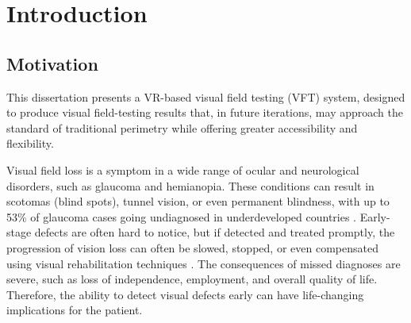 \documentclass{l4proj}
\begin{document}
%
%
%
%
\chapter{Introduction}


\section{Motivation}
 

This dissertation presents a VR-based visual field testing (VFT) system, designed to produce visual field-testing results that, in future iterations, may approach the standard of traditional perimetry while offering greater accessibility and flexibility. 

Visual field loss is a symptom in a wide range of ocular and neurological disorders, such as glaucoma and hemianopia. These conditions can result in scotomas (blind spots), tunnel vision, or even permanent blindness, with up to 53\% of glaucoma cases going undiagnosed in underdeveloped countries \citep{mot1}. Early-stage defects are often hard to notice, but if detected and treated promptly, the progression of vision loss can often be slowed, stopped, or even compensated using visual rehabilitation techniques \citep{mot2}. The consequences of missed diagnoses are severe, such as loss of independence, employment, and overall quality of life. Therefore, the ability to detect visual defects early can have life-changing implications for the patient. 
\end{document}
